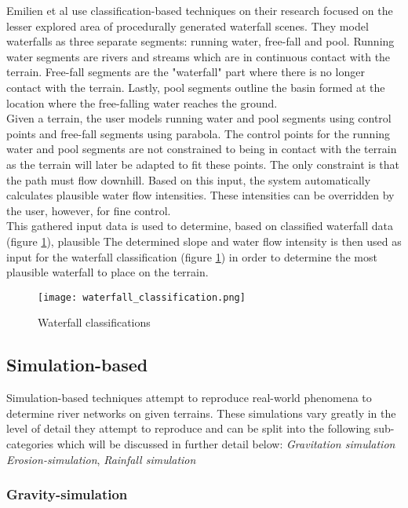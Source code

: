 Emilien et al \cite{Emilien2014} use classification-based techniques on their research focused on the lesser explored area of procedurally generated waterfall scenes. They model waterfalls as three separate segments: running water, free-fall and pool. Running water segments are rivers and streams which are in continuous contact with the terrain. Free-fall segments are the "waterfall" part where there is no longer contact with the terrain. Lastly, pool segments outline the basin formed at the location where the free-falling water reaches the ground.\\
Given a terrain, the user models running water and pool segments using control points and free-fall segments using parabola. The control points for the running water and pool segments are not constrained to being in contact with the terrain as the terrain will later be adapted to fit these points. The only constraint is that the path must flow downhill. Based on this input, the system automatically calculates plausible water flow intensities. These intensities can be overridden by the user, however, for fine control.\\
This gathered input data is used to determine, based on classified waterfall data (figure \ref{Waterfall classifications}), plausible 
The determined slope and water flow intensity is then used as input for the waterfall classification (figure \ref{Waterfall classifications}) in order to determine the most plausible waterfall to place on the terrain.

\begin{figure}[h]
  \centering
	\label{Waterfall classifications}
	\texttt{[image: waterfall\_classification.png]}
	\caption{Waterfall classifications \cite{Emilien2014}}
\end{figure}

\subsection{Simulation-based}

Simulation-based techniques attempt to reproduce real-world phenomena to determine river networks on given terrains. These simulations vary greatly in the level of detail they attempt to reproduce and can be split into the following sub-categories which will be discussed in further detail below: \textit{Gravitation simulation} \textit{Erosion-simulation}, \textit{Rainfall simulation} \\

\subsubsection{Gravity-simulation}

